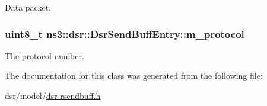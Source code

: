 Data packet. 

\subsubsection[{\texorpdfstring{m\+\_\+protocol}{m_protocol}}]{\setlength{\rightskip}{0pt plus 5cm}uint8\+\_\+t ns3\+::dsr\+::\+Dsr\+Send\+Buff\+Entry\+::m\+\_\+protocol\hspace{0.3cm}{\ttfamily [private]}}\hypertarget{classns3_1_1dsr_1_1DsrSendBuffEntry_a5a3fa0f68c51794cb1c35d2d038eb0c4}{}\label{classns3_1_1dsr_1_1DsrSendBuffEntry_a5a3fa0f68c51794cb1c35d2d038eb0c4}


The protocol number. 



The documentation for this class was generated from the following file\+:\begin{DoxyCompactItemize}
\item 
dsr/model/\hyperlink{dsr-rsendbuff_8h}{dsr-\/rsendbuff.\+h}\end{DoxyCompactItemize}
